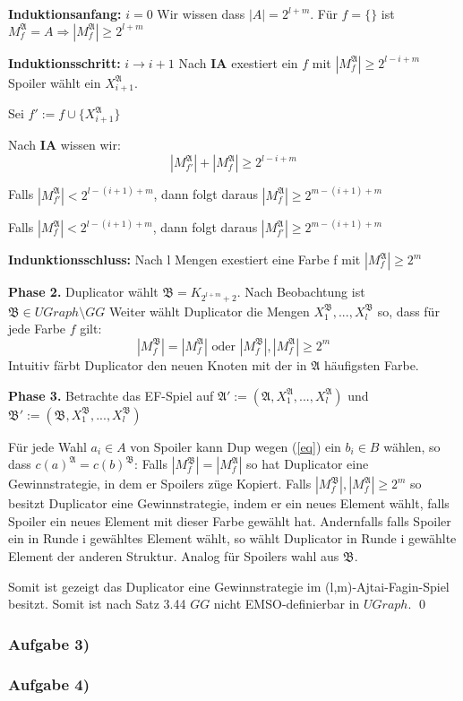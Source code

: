 \documentclass[12pt]{article}
\begin{document}
  \textbf{Induktionsanfang:} $i=0$ Wir wissen dass $|A| = 2^{l+m}$. Für $f=\{\}$
  ist $M_f^\mathfrak{A} = A \Rightarrow |M_f^\mathfrak{A}|\geq 2^{l+m}$

  \textbf{Induktionsschritt:} $i \rightarrow i+1$
  Nach \textbf{IA} exestiert ein $f$ mit $|M_f^\mathfrak{A}|\geq 2^{l-i+m}$
  Spoiler wählt ein $X_{i+1}^\mathfrak{A}$.

  Sei $f' := f \cup \{X_{i+1}^\mathfrak{A}\}$

  Nach \textbf{IA} wissen wir:
  \[ |M_{f'}^\mathfrak{A}| + |M_f^\mathfrak{A}| \geq 2^{l-i+m} \] 

  Falls $|M_{f'}^\mathfrak{A}| < 2^{l-(i+1)+m}$, dann folgt daraus 
  $|M_f^\mathfrak{A}|\geq 2^{m-(i+1)+m}$

  Falls $|M_f^\mathfrak{A}| < 2^{l-(i+1)+m}$, dann folgt daraus 
  $|M_{f'}^\mathfrak{A}|\geq 2^{m-(i+1)+m}$

  \textbf{Indunktionsschluss:} Nach l Mengen exestiert eine Farbe f mit 
  $|M_f^\mathfrak{A}|\geq 2^{m}$
  
\textbf{Phase 2.} Duplicator wählt $\mathfrak{B} = K_{2^{l+m}+2}$. Nach Beobachtung
ist $\mathfrak{B}\in UGraph \setminus GG$
Weiter wählt Duplicator die Mengen $X_1^\mathfrak{B}, ..., X_l^\mathfrak{B}$ so, 
dass für jede Farbe $f$ gilt:
\begin{equation}
  |M_f^\mathfrak{B}|=|M_f^\mathfrak{A}|\text{ oder } |M_f^\mathfrak{B}|,|M_f^\mathfrak{A}|
  \geq 2^m \label{eq}
\end{equation}
Intuitiv färbt Duplicator den neuen Knoten mit der in $\mathfrak{A}$ häufigsten Farbe.

\textbf{Phase 3.} Betrachte das EF-Spiel auf $\mathfrak{A}' := (\mathfrak{A}, 
X_1^\mathfrak{A}, ... , X_l^\mathfrak{A})$ und $\mathfrak{B}' := (\mathfrak{B}, 
X_1^\mathfrak{B}, ... , X_l^\mathfrak{B})$

Für jede Wahl $a_i\in A$ von Spoiler kann Dup wegen (\ref{eq}) ein $b_i\in B$ wählen,
so dass $c(a)^\mathfrak{A} = c(b)^\mathfrak{B}$:
Falls $|M_f^\mathfrak{B}|=|M_f^\mathfrak{A}|$ so hat Duplicator eine Gewinnstrategie, 
in dem er Spoilers züge Kopiert. Falls $|M_f^\mathfrak{B}|,|M_f^\mathfrak{A}|
\geq 2^m $ so besitzt Duplicator eine Gewinnstrategie, indem er ein neues Element wählt,
falls Spoiler ein neues Element mit dieser Farbe gewählt hat. Andernfalls falls Spoiler
ein in Runde i gewähltes Element wählt, so wählt Duplicator in Runde i gewählte Element
der anderen Struktur. 
Analog für Spoilers wahl aus $\mathfrak{B}$.

Somit ist gezeigt das Duplicator eine Gewinnstrategie im (l,m)-Ajtai-Fagin-Spiel
besitzt. Somit ist nach Satz 3.44 $GG$ nicht EMSO-definierbar in $UGraph$. \qed






\subsubsection*{Aufgabe 3)}
\subsubsection*{Aufgabe 4)}
\end{document}
